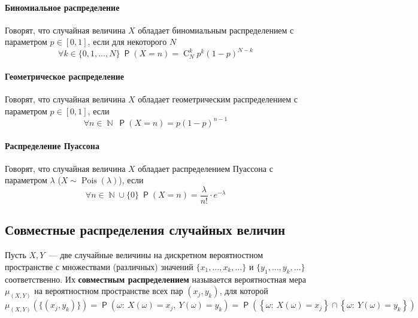 \documentclass[12pt]{article}
\DeclareMathOperator{\comb}{C}
\DeclareMathOperator{\prob}{\mathsf{P}}
\DeclareMathOperator{\NN}{\mathbb{N}}
\DeclareMathOperator{\Pois}{Pois}
\begin{document}
    \paragraph{Биномиальное распределение}
    Говорят, что случайная величина $X$ обладает биномиальным распределением с параметром $p \in \left[0, 1\right]$, если для некоторого $N$
    \begin{equation*}
        \forall k \in \lbrace 0, 1, \ldots, N \rbrace\ \prob (X = n) = \comb_N^k p^k \left(1 - p\right)^{N-k}
    \end{equation*}
    
    \paragraph{Геометрическое распределение}
    Говорят, что случайная величина $X$ обладает геометрическим распределением с параметром $p \in \left[0, 1\right]$, если
    \begin{equation*}
        \forall n \in \NN\ \prob (X = n) = p\left(1 - p\right)^{n - 1}
    \end{equation*}
    
    \paragraph{Распределение Пуассона}
    Говорят, что случайная величина $X$ обладает распределением Пуассона с параметром $\lambda$ ($X \sim \Pois(\lambda)$), если
    \begin{equation*}
        \forall n \in \NN \cup \lbrace 0\rbrace\ \prob (X = n) = \frac{\lambda}{n!} \cdot e^{-\lambda}
    \end{equation*}
    
    \subsection{Совместные распределения случайных величин}
    Пусть $X, Y$~--- две случайные величины на дискретном вероятностном пространстве с множествами (различных) значений $\lbrace x_1, \ldots, x_k, \ldots \rbrace$ и $\lbrace y_1, \ldots, y_k, \ldots\rbrace$ соответственно. Их \textbf{совместным распределением} называется вероятностная мера $\mu_{\left(X,Y\right)}$ на вероятностном пространстве всех пар $\left(x_j, y_k\right)$, для которой
    \begin{equation*}
        \mu_{\left(X,Y\right)}\left(\lbrace \left(x_j, y_k\right)\rbrace\right) = \prob(\omega:\ X(\omega)=x_j,\ Y(\omega)=y_k) = \prob(\left\{\omega:\ X(\omega)=x_j\right\}\cap \left\{\omega:\ Y(\omega)=y_k\right\})
    \end{equation*}
    
\end{document}
